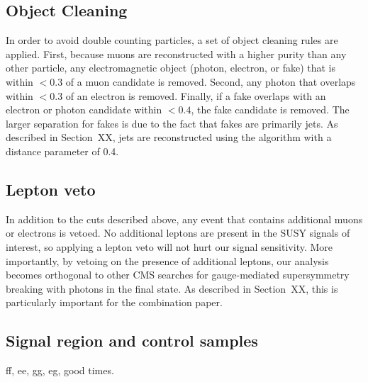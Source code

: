 \subsection{Object Cleaning}
\label{sec:ObjCleaning}

In order to avoid double counting particles, a set of object cleaning rules are applied. 
First, because muons are reconstructed with a higher purity than any other particle, 
any electromagnetic object (photon, electron, or fake) that is within \dR $< 0.3$ of a muon candidate is removed.
Second, any photon that overlaps within \dR $< 0.3$ of an electron is removed. Finally, if a fake overlaps with an electron or 
photon candidate within \dR $< 0.4$, the fake candidate is removed. The larger \dR separation for fakes is due to the fact
that fakes are primarily jets. As described in Section~XX, jets are reconstructed using the \antikt algorithm with a distance
parameter of 0.4.  

\subsection{Lepton veto}
\label{sec:lepVeto}

In addition to the cuts described above, any event that contains additional muons or electrons is vetoed. 
No additional leptons are present in the SUSY signals of interest, so applying a lepton veto will not hurt our signal sensitivity.
More importantly, by vetoing on the presence of additional leptons, our analysis becomes orthogonal to other CMS searches for
gauge-mediated supersymmetry breaking with photons in the final state. As described in Section~XX, this is particularly
important for the combination paper.

\subsection{Signal region and control samples}
\label{sec:samples}
ff, ee, gg, eg, good times.

